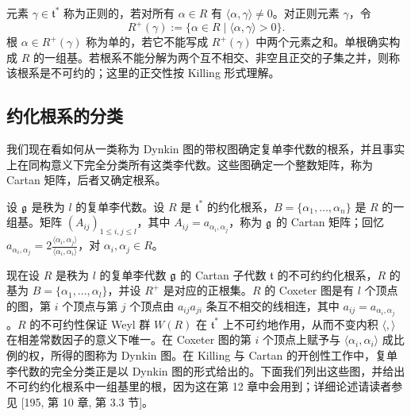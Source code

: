 元素 $\gamma\in\mathfrak{t}^{*}$ 称为正则的，若对所有 $\alpha\in R$ 有 $\langle\alpha,\gamma\rangle\ne0$。对正则元素 $\gamma$，令
\[
R^{+}(\gamma):=\{\alpha\in R\mid\langle\alpha,\gamma\rangle>0\}.
\]
根 $\alpha\in R^{+}(\gamma)$ 称为单的，若它不能写成 $R^{+}(\gamma)$ 中两个元素之和。单根确实构成 $R$ 的一组基。若根系不能分解为两个互不相交、非空且正交的子集之并，则称该根系是不可约的；这里的正交性按 Killing 形式理解。

\subsection{约化根系的分类}

我们现在看如何从一类称为 Dynkin 图的带权图确定复单李代数的根系，并且事实上在同构意义下完全分类所有这类李代数。这些图确定一个整数矩阵，称为 Cartan 矩阵，后者又确定根系。

\begin{definition}[A.15] 设 $\mathfrak{g}$ 是秩为 $l$ 的复单李代数。设 $R$ 是 $\mathfrak{t}^{*}$ 的约化根系，$B=\{\alpha_1,\dots,\alpha_n\}$ 是 $R$ 的一组基。矩阵 $(A_{ij})_{1\le i,j\le l}$，其中 $A_{ij}=a_{\alpha_i,\alpha_j}$，称为 $\mathfrak{g}$ 的 Cartan 矩阵；回忆 $a_{\alpha_i,\alpha_j}=2\frac{\langle\alpha_i,\alpha_j\rangle}{\langle\alpha_i,\alpha_i\rangle}$，对 $\alpha_i,\alpha_j\in R$。
\end{definition}

现在设 $R$ 是秩为 $l$ 的复单李代数 $\mathfrak{g}$ 的 Cartan 子代数 $\mathfrak{t}$ 的不可约约化根系，$R$ 的基为 $B=\{\alpha_1,\dots,\alpha_l\}$，并设 $R^{+}$ 是对应的正根集。$R$ 的 Coxeter 图是有 $l$ 个顶点的图，第 $i$ 个顶点与第 $j$ 个顶点由 $a_{ij}a_{ji}$ 条互不相交的线相连，其中 $a_{ij}=a_{\alpha_i,\alpha_j}$。$R$ 的不可约性保证 Weyl 群 $W(R)$ 在 $\mathfrak{t}^{*}$ 上不可约地作用，从而不变内积 $\langle,\rangle$ 在相差常数因子的意义下唯一。在 Coxeter 图的第 $i$ 个顶点上赋予与 $\langle\alpha_i,\alpha_i\rangle$ 成比例的权，所得的图称为 Dynkin 图。在 Killing 与 Cartan 的开创性工作中，复单李代数的完全分类正是以 Dynkin 图的形式给出的。下面我们列出这些图，并给出不可约约化根系中一组基里的根，因为这在第 12 章中会用到；详细论述请读者参见 [195, 第 10 章, 第 3.3 节]。


